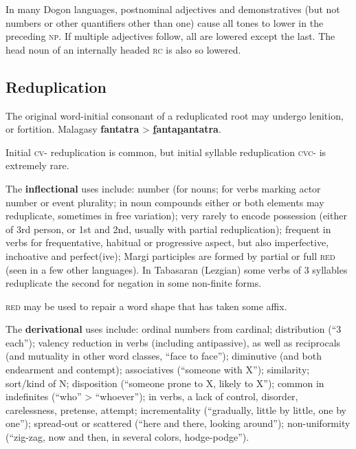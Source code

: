 \documentclass[11pt]{article}
\newcommand{\LL}[1]{\textbf{#1}}  %
\newcommand{\I}[1]{\textsc{#1}}   %
\begin{document}
In many Dogon languages, postnominal adjectives and demonstratives
(but not numbers or other quantifiers other than one) cause all tones
to lower in the preceding \I{np}.  If multiple adjectives follow, all
are lowered except the last. The head noun of an internally headed
\I{rc} is also so lowered.

\subsection{Reduplication} The original word-initial consonant of a
reduplicated root may undergo lenition, or fortition.  Malagasy
\LL{fantatra} > \LL{\uline{f}anta\uline{p}antatra}.

Initial \I{cv-} reduplication is common, but initial syllable
reduplication \I{cvc-} is extremely rare.

The \textbf{inflectional} uses include: number (for nouns; for verbs
marking actor number or event plurality; in noun compounds either or
both elements may reduplicate, sometimes in free variation); very
rarely to encode possession (either of 3rd person, or 1st and 2nd,
usually with partial reduplication); frequent in verbs for
frequentative, habitual or progressive aspect, but also imperfective,
inchoative and perfect(ive); Margi participles are formed by partial
or full \I{red} (seen in a few other languages).  In Tabasaran
(Lezgian) some verbs of 3 syllables reduplicate the second for
negation in some non-finite forms.

\I{red} may be used to repair a word shape that has taken some affix.

The \textbf{derivational} uses include: ordinal numbers from cardinal;
distribution (``3 each''); valency reduction in verbs (including
antipassive), as well as reciprocals (and mutuality in other word
classes, ``face to face''); diminutive (and both endearment and
contempt); associatives (``someone with X''); similarity; sort/kind of
N; disposition (``someone prone to X, likely to X''); common in
indefinites (``who'' > ``whoever''); in verbs, a lack of control,
disorder, carelessness, pretense, attempt; incrementality
(``gradually, little by little, one by one''); spread-out or scattered
(``here and there, looking around''); non-uniformity (``zig-zag, now
and then, in several colors, hodge-podge'').
\end{document}
